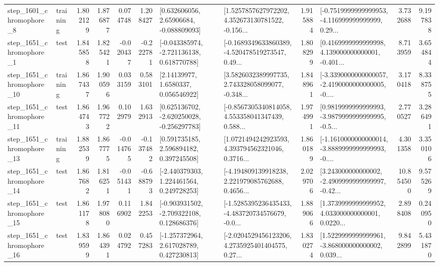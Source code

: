 \begin{tabular}{llrrrrllrlrr}
  step\_1601\_chromophore\_8 &  training &      1.802129 &    1.876877 &      0.074748 &  1.208427 &     [0.632606056, 2.65906684, -0.088809093] &  [1.5257857627972202, 4.352673130781522, -0.156... &       1.915884 &  [-0.7519999999999953, -4.116999999999999, 0.29... &            3.732688 &          9.197838 \\
  step\_1651\_chromophore\_1 &      test &      1.845858 &    1.825421 &     -0.020437 & -0.222781 &   [-0.043385974, -2.721136138, 0.618770788] &  [-0.1689349633860389, -4.520478519273547, 0.49... &       1.808299 &  [0.4169999999999998, 4.139000000000001, -0.401... &            8.713959 &          3.654844 \\
 step\_1651\_chromophore\_10 &  training &      1.867437 &    1.900596 &      0.033159 &  0.583101 &        [2.14139977, 1.6580337, 0.056546922] &  [3.5826032389997735, 2.743328058099077, -0.348... &       1.848961 &  [-3.3390000000000057, -2.4190000000000005, -0.... &            3.170418 &          8.338755 \\
 step\_1651\_chromophore\_11 &      test &      1.864743 &    1.967722 &      0.102979 &  1.632913 &   [0.625136702, -2.620250028, -0.256297783] &  [-0.8567305340814058, 4.553358041347439, 0.588... &       1.974991 &  [0.9819999999999993, -3.9879999999999995, -0.5... &            2.770527 &          3.286491 \\
 step\_1651\_chromophore\_13 &  training &      1.882539 &    1.867775 &     -0.014765 & -0.137482 &     [0.591735185, 2.596894182, 0.397245508] &  [1.0721494242923593, 4.393794562321046, 0.3716... &       1.860189 &  [-1.1610000000000014, -3.8889999999999993, -0.... &            4.301358 &          3.350106 \\
 step\_1651\_chromophore\_14 &      test &      1.867682 &    1.816251 &     -0.051431 & -0.688793 &    [-2.440379303, 1.224461564, 0.249728253] &  [-4.194809139918238, 2.221979085762688, 0.4656... &       2.029706 &  [3.243000000000002, -2.4909999999999997, -0.42... &           10.854500 &          9.575269 \\
 step\_1651\_chromophore\_15 &      test &      1.861178 &    1.978080 &      0.116902 &  1.842253 &   [-0.903931502, -2.709322108, 0.128686376] &  [-1.5285395236435433, -4.483720734576679, -0.0... &       1.889066 &  [1.3739999999999952, 4.033000000000001, 0.0220... &            2.898408 &          0.240950 \\
 step\_1651\_chromophore\_16 &      test &      1.839599 &    1.864391 &      0.024792 &  0.457283 &    [-1.257372964, 2.617028789, 0.427230813] &  [-2.0204529456123206, 4.2735925401404575, 0.27... &       1.830274 &  [1.5229999999999961, -3.868000000000002, 0.039... &            9.842899 &          5.431870 \\

\end{tabular}
